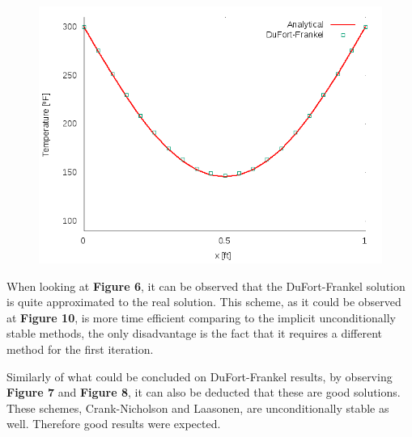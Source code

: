 \documentclass[12pt]{report}
\begin{document}
\begin{figure}[!htb]
  \centering
  \includegraphics[width=.5\linewidth]{DuFort-Frankelt_0_5.png}
\end{figure}

\par When looking at \textbf{Figure 6}, it can be observed that the DuFort-Frankel solution is quite approximated to the real solution. This scheme, as it could be observed at \textbf{Figure 10}, is more time efficient comparing to the implicit unconditionally stable methods, the only disadvantage is the fact that it requires a different method for the first iteration.

\par Similarly of what could be concluded on DuFort-Frankel results, by observing \textbf{Figure 7} and \textbf{Figure 8}, it can also be deducted that these are good solutions. These schemes, Crank-Nicholson and Laasonen, are unconditionally stable as well. Therefore good results were expected.
\end{document}
